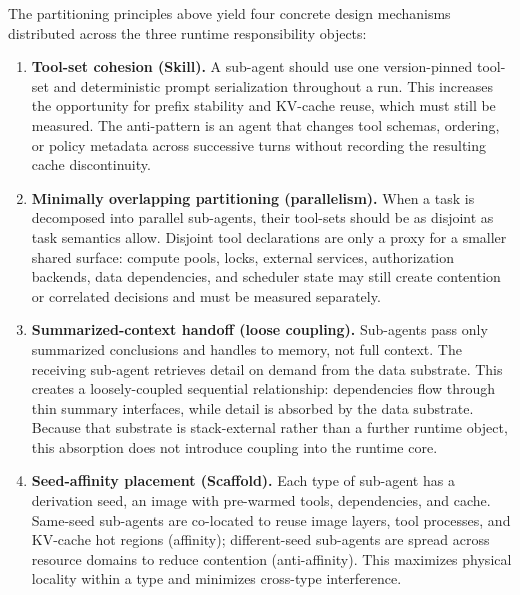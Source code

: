 The partitioning principles above yield four concrete design mechanisms distributed across the three runtime responsibility objects:

\begin{enumerate}
\item \textbf{Tool-set cohesion (Skill).} A sub-agent should use one version-pinned tool-set and deterministic prompt serialization throughout a run. This increases the opportunity for prefix stability and KV-cache reuse, which must still be measured. The anti-pattern is an agent that changes tool schemas, ordering, or policy metadata across successive turns without recording the resulting cache discontinuity.

\item \textbf{Minimally overlapping partitioning (parallelism).} When a task is decomposed into parallel sub-agents, their tool-sets should be as disjoint as task semantics allow. Disjoint tool declarations are only a proxy for a smaller shared surface: compute pools, locks, external services, authorization backends, data dependencies, and scheduler state may still create contention or correlated decisions and must be measured separately.

\item \textbf{Summarized-context handoff (loose coupling).} Sub-agents pass only summarized conclusions and handles to memory, not full context. The receiving sub-agent retrieves detail on demand from the data substrate. This creates a loosely-coupled sequential relationship: dependencies flow through thin summary interfaces, while detail is absorbed by the data substrate. Because that substrate is stack-external rather than a further runtime object, this absorption does not introduce coupling into the runtime core.

\item \textbf{Seed-affinity placement (Scaffold).} Each type of sub-agent has a derivation seed, an image with pre-warmed tools, dependencies, and cache. Same-seed sub-agents are co-located to reuse image layers, tool processes, and KV-cache hot regions (affinity); different-seed sub-agents are spread across resource domains to reduce contention (anti-affinity). This maximizes physical locality within a type and minimizes cross-type interference.
\end{enumerate}

